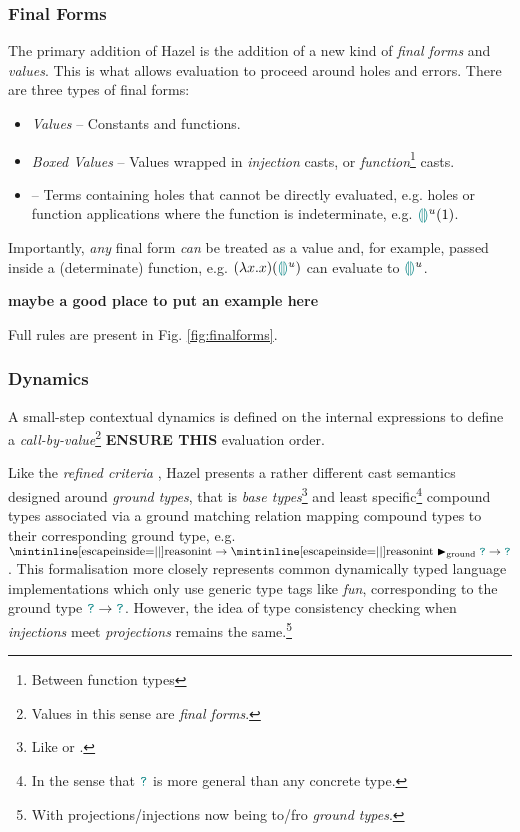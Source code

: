 \subsubsection{Final Forms}
The primary addition of Hazel is the addition of a new kind of \textit{final forms} and \textit{values}. This is what allows evaluation to proceed around holes and errors. There are three types of final forms:
\begin{itemize}
\item \textit{Values} -- Constants and functions.
\item \textit{Boxed Values} -- Values wrapped in \textit{injection} casts, or \textit{function}\footnote{Between function types} casts.
\item {} -- Terms containing holes that cannot be directly evaluated, e.g. holes or function applications where the function is indeterminate, e.g. ${\color{teal}\llparenthesis}  {\color{teal}\rrparenthesis}^u(1)$.
\end{itemize}
 Importantly, \textit{any} final form \textit{can} be treated as a value and, for example, passed inside a (determinate) function, e.g. $(\lambda x. x)({\color{teal}\llparenthesis}  {\color{teal}\rrparenthesis}^u)$ can evaluate to ${\color{teal}\llparenthesis}  {\color{teal}\rrparenthesis}^u$.
 
\textbf{maybe a good place to put an example here}

Full rules are present in Fig. \ref{fig:finalforms}.

\subsubsection{Dynamics}
A small-step contextual dynamics \cite[ch. 5]{PracticalFoundations} is defined on the internal expressions to define a \textit{call-by-value}\footnote{Values in this sense are \textit{final forms}.} \textbf{ENSURE THIS} evaluation order. 

Like the \textit{refined criteria}  \cite{GradualRefined}, Hazel presents a rather different cast semantics designed around \textit{ground types}, that is \textit{base types}\footnote{Like  or .} and least specific\footnote{In the sense that ${\color{teal}\texttt{?}}$ is more general than any concrete type.} compound types associated via a ground matching relation mapping compound types to their corresponding ground type, e.g. $\code{int} \to \code{int} \groundmatch \dyn \to \dyn$. This formalisation more closely represents common dynamically typed language implementations which only use generic type tags like \textit{fun}, corresponding to the ground type ${\color{teal}\texttt{?}} \to {\color{teal}\texttt{?}}$. However, the idea of type consistency checking when \textit{injections} meet \textit{projections} remains the same.\footnote{With projections/injections now being to/fro \textit{ground types}.}


